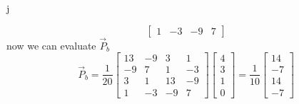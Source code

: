 j\documentclass[12pt]{article}
\begin{document}
\begin{enumerate}
\[\begin{bmatrix}
        1 & -3 & -9 & 7
        \end{bmatrix}
        \]
        now we can evaluate $\vec{P}_b$
        \[
        \vec{P}_b = 
        \frac{1}{20}
        \begin{bmatrix}
        13 & -9 & 3 & 1 \\
        -9 & 7 & 1 & -3 \\
        3 & 1 & 13 & -9 \\
        1 & -3 & -9 & 7
        \end{bmatrix}
        \begin{bmatrix}
            4\\3\\1\\0
        \end{bmatrix}
        =
        \frac{1}{10}
        \begin{bmatrix}
            14\\-7\\14\\-7
        \end{bmatrix}
        \]
	\\ \\ \\ 


\end{enumerate}
\end{document}
